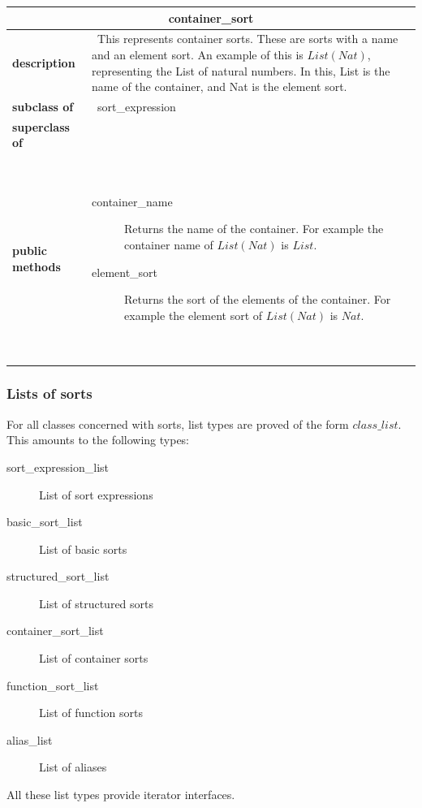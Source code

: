 \documentclass[a4paper,11pt]{article}
\newcommand{\List}{{\mathit{List}}}
\newcommand{\dataclass}[5]{
\begin{flushleft}
\begin{longtable}{p{3cm} p{11cm}}
\multicolumn{2}{c}{\textbf{#1}}\\\hline\hline
\textbf{description} & ~#2~ \\\hline
\textbf{subclass of} & ~#3~ \\\hline
\textbf{superclass of} & ~#4~ \\\hline
\textbf{public methods} & ~#5~ \\\hline
\end{longtable}
\end{flushleft}
}
\begin{document}
\dataclass
  {container\_sort}
  {This represents container sorts. These are sorts with a name and an element sort. An example of this is $\List(Nat)$, representing the List of natural numbers. In this, List is the name of the container, and Nat is the element sort.}
  {sort\_expression}
  {}
  {\begin{description}
    \item[container\_name] Returns the name of the container. For example the container name of $\List(Nat)$ is $List$.
    \item[element\_sort] Returns the sort of the elements of the container. For example the element sort of $\List(Nat)$ is $Nat$.
   \end{description}}


\subsubsection{Lists of sorts}
For all classes concerned with sorts, list types are proved of the form $class\_list$. This amounts to the following types:
\begin{description}
 \item[sort\_expression\_list] List of sort expressions
 \item[basic\_sort\_list] List of basic sorts
 \item[structured\_sort\_list] List of structured sorts
 \item[container\_sort\_list] List of container sorts
 \item[function\_sort\_list] List of function sorts
 \item[alias\_list] List of aliases
\end{description}

All these list types provide iterator interfaces.

\FloatBarrier
\end{document}
